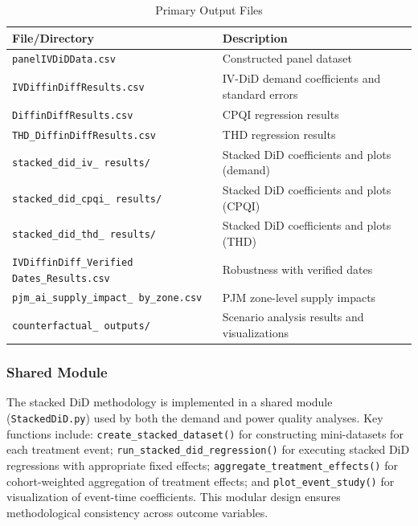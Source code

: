 \documentclass[a4paper,fleqn,longmktitle]{cas-sc}
\begin{document}
\begin{table}[htbp]
\centering
\caption{Primary Output Files}
\label{tab:outputs}
\footnotesize %
\begin{tabularx}{\columnwidth}{@{} >{\raggedright\arraybackslash}X >{\raggedright\arraybackslash}X @{}}
\toprule
\textbf{File/Directory} & \textbf{Description} \\
\midrule
\texttt{panelIVDiDData.csv} & Constructed panel dataset \\
\texttt{IVDiffinDiffResults.csv} & IV-DiD demand coefficients and standard errors \\
\texttt{DiffinDiffResults.csv} & CPQI regression results \\
\texttt{THD\_DiffinDiffResults.csv} & THD regression results \\
\texttt{stacked\_did\_iv\_ \newline results/} & Stacked DiD coefficients and plots (demand) \\
\texttt{stacked\_did\_cpqi\_ \newline results/} & Stacked DiD coefficients and plots (CPQI) \\
\texttt{stacked\_did\_thd\_ \newline results/} & Stacked DiD coefficients and plots (THD) \\
\texttt{IVDiffinDiff\_Verified \newline Dates\_Results.csv} & Robustness with verified dates \\
\texttt{pjm\_ai\_supply\_impact\_ \newline by\_zone.csv} & PJM zone-level supply impacts \\
\texttt{counterfactual\_ \newline outputs/} & Scenario analysis results and visualizations \\
\bottomrule
\end{tabularx}
\end{table}

\subsubsection{Shared Module}
\label{appendix:shared}

The stacked DiD methodology is implemented in a shared module (\texttt{StackedDiD.py}) used by both the demand and power quality analyses. Key functions include: \texttt{create\_stacked\_dataset()} for constructing mini-datasets for each treatment event; \texttt{run\_stacked\_did\_regression()} for executing stacked DiD regressions with appropriate fixed effects; \texttt{aggregate\_treatment\_effects()} for cohort-weighted aggregation of treatment effects; and \texttt{plot\_event\_study()} for visualization of event-time coefficients. This modular design ensures methodological consistency across outcome variables.
\end{document}
